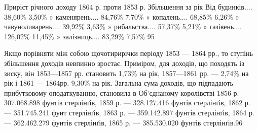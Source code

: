 Приріст річного доходу 1864 р. проти 1853 р. Збільшення за рік
Від    будинків....                           38,60\%                                                
      3,50\%
» каменярень....                             84,76\%                                                 
    7,70\%
» копалень....                                 68,85\%                                               
 6,26\%
» чавуноливарень....                      39,92\%                                               3,63\%
» рибальства....                              57,37\%                                               
5,21\%
» газівень....                                 126,02\%                                              
 11,45\%
» залізниць....                                    83,29\%                                           
  7,57\% 95

Якщо порівняти між собою щочотирирічки періоду 1853 —
1864 рр., то ступінь збільшення доходів невпинно зростає. Приміром,
для доходів, що походять із зиску, він 1853—1857 рр.
становить 1,73\% на рік, 1857—1861 рр. — 2,74\% на рік і 1861 —
1864рр. 9,30\% на рік. Загальна сума доходів, що підпадають прибутковому
оподаткуванню, становила в Об’єднаному королівстві
1856 р. 307.068.898 фунтів стерлінґів, 1859 р. — 328.127.416 фунтів
стерлінґів, 1862 р. — 351.745.241 фунт стерлінґів, 1863 р. —
359.142.897 фунтів стерлінґів, 1864 р. — 362.462.279 фунтів стерлінґів,
1865 р. — 385.530.020 фунтів стерлінґів.96

